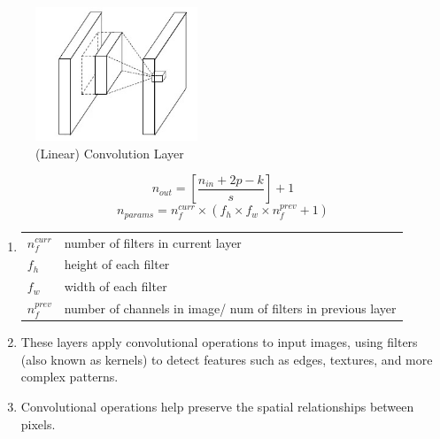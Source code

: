 \begin{table}[h]
    \begin{minipage}{0.44\linewidth}
        \begin{figure}[H]
            \centering
            \includegraphics[width=\linewidth, height=4cm, keepaspectratio]{Pictures/layers/conv-layer-linear.jpg}
            \caption{(Linear) Convolution Layer \cite{medium/towardsdatascience.com/review-nin-network-in-network-image-classification-69e271e499ee}}
        \end{figure}
    \end{minipage}
    \hfill
    \begin{minipage}{0.54\linewidth}
        \[
           \displaystyle n_{out} = \left[ \dfrac{n_{in} + 2p - k}{s} \right] + 1
        \]
        \[
            n_{params} = n_f^{curr} \times ( f_h \times f_w \times  n_f^{prev} + 1)
        \]
        
        \begin{enumerate}
            \item[] 
            \begin{customTableWrapper}{1.2}
            \begin{table}[H]
                \begin{tabular}{l p{5.5cm}}
                    $n_f^{curr}$ & number of filters in current layer \\
                
                    $f_h$ & height of each filter \\
                    
                    $f_w$ & width of each filter\\
                    
                    $n_f^{prev}$ & number of channels in image/ num of filters in previous layer
                \end{tabular}
            \end{table}
            \end{customTableWrapper}
            
            \item These layers apply convolutional operations to input images, using filters (also known as kernels) to detect features such as edges, textures, and more complex patterns. 
            
            \item Convolutional operations help preserve the spatial relationships between pixels.
        \end{enumerate}
    \end{minipage}
\end{table}

